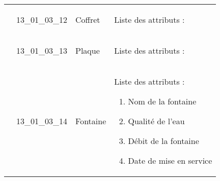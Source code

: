 \documentclass[12pt,titlepage]{book}
\begin{document}
\begin{supertabular}{|p{10cm}|c|p{13cm}|p{12cm}|}
                    & 13\_01\_03\_12 & Coffret & Liste des attributs :
\begin{enumerate}
\end{enumerate}
\\


                    & 13\_01\_03\_13 & Plaque & Liste des attributs :
\begin{enumerate}
\end{enumerate}
\\


                    & 13\_01\_03\_14 & Fontaine & Liste des attributs :
\begin{enumerate}
  \item Nom de la fontaine  \item Qualité de l'eau  \item Débit de la fontaine  \item Date de mise en service\end{enumerate}
\\
\hline
\end{supertabular}
\end{document}
